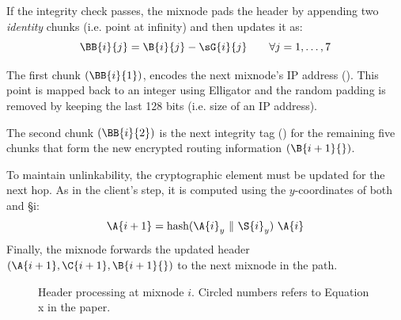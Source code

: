 \noindent If the integrity check passes, the mixnode pads the header by appending two \textit{identity} chunks (i.e. point at infinity) and then updates it as:
\begin{equation}
{\BB{i}{j}} = \B{i}{j} - \sG{i}{j} \qquad \forall j = 1, \dots, 7
\label{eq:decrypt}
\end{equation}

The first chunk $({\BB{i}{1}})$, encodes the next mixnode's IP address (). 
This point is mapped back to an integer using Elligator and the random padding is removed by keeping the last 128 bits (i.e. size of an IP address).

\noindent The second chunk $({\BB{i}{2}})$ is the next integrity tag () for the remaining five chunks that form the new encrypted routing information $(\B{i+1}{})$.

To maintain unlinkability, the cryptographic element  must be updated for the next hop. 
As in the client's step, it is computed using the $y$-coordinates of both  and \S{i}:
\begin{equation}
\A{i+1} = \text{hash}({\A{i}}_y \ \| \ {\S{i}}_y) \ \A{i}
\label{eq:update_alpha}
\end{equation}
Finally, the mixnode forwards the updated header $(\A{i+1}, \C{i+1}, \B{i+1}{})$ to the next mixnode in the path.

\begin{figure}[H]
    \centering
    \resizebox{1.\linewidth}{!}{}
    \caption{Header processing at mixnode $i$. Circled numbers \eq[x] refers to Equation x in the paper.}
    \label{fig:mixnode_decryption}
\end{figure}
